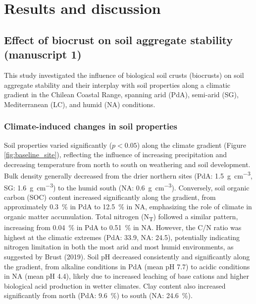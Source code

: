 \chapter{Results and discussion}

\section{Effect of biocrust on soil aggregate stability (manuscript 1)}
\label{sec:BiocrustOnAggregateStability }

This study investigated the influence of biological soil crusts (biocrusts) on soil aggregate stability and their interplay with soil properties along a climatic gradient in the Chilean Coastal Range, spanning arid (PdA), semi-arid (SG), Mediterranean (LC), and humid (NA) conditions.

\subsection{Climate-induced changes in soil properties}
\label{sec:ClimateInducedSoil}

Soil properties varied significantly ($p < 0.05$) along the climate gradient (Figure \ref{fig:baseline_site}), reflecting the influence of increasing precipitation and decreasing temperature from north to south on weathering and soil development. Bulk density generally decreased from the drier northern sites (PdA: \SI{1.5}{\gram\per\cubic\centi\meter}, SG: \SI{1.6}{\gram\per\cubic\centi\meter}) to the humid south (NA: \SI{0.6}{\gram\per\cubic\centi\meter}). Conversely, soil organic carbon (SOC) content increased significantly along the gradient, from approximately \SI{0.3}{\percent} in PdA to \SI{12.5}{\percent} in NA, emphasizing the role of climate in organic matter accumulation. Total nitrogen (N\textsubscript{T}) followed a similar pattern, increasing from \SI{0.04}{\percent} in PdA to \SI{0.51}{\percent} in NA. However, the C/N ratio was highest at the climatic extremes (PdA: 33.9, NA: 24.5), potentially indicating nitrogen limitation in both the most arid and most humid environments, as suggested by Brust (2019). Soil pH decreased consistently and significantly along the gradient, from alkaline conditions in PdA (mean pH 7.7) to acidic conditions in NA (mean pH 4.4), likely due to increased leaching of base cations and higher biological acid production in wetter climates. Clay content also increased significantly from north (PdA: \SI{9.6}{\percent}) to south (NA: \SI{24.6}{\percent}).


